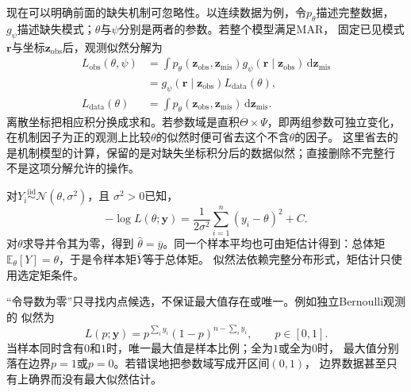 现在可以明确前面的缺失机制可忽略性。以连续数据为例，令\(p_\theta\)描述完整数据，
\(g_\psi\)描述缺失模式；\(\theta\)与\(\psi\)分别是两者的参数。若整个模型满足MAR，
固定已见模式\(\bm r\)与坐标\(\bm z_{\mathrm{obs}}\)后，观测似然分解为
\begin{equation}
\begin{aligned}
 L_{\mathrm{obs}}(\theta,\psi)
 &=\int p_\theta(\bm z_{\mathrm{obs}},\bm z_{\mathrm{mis}})
       g_\psi(\bm r\mid\bm z_{\mathrm{obs}})\,\mathrm d\bm z_{\mathrm{mis}}\\
 &=g_\psi(\bm r\mid\bm z_{\mathrm{obs}})
       L_{\mathrm{data}}(\theta),\\
 L_{\mathrm{data}}(\theta)
 &=\int p_\theta(\bm z_{\mathrm{obs}},\bm z_{\mathrm{mis}})
       \,\mathrm d\bm z_{\mathrm{mis}}.
\end{aligned}
\label{eq:statistics-missing-likelihood}
\end{equation}
离散坐标把相应积分换成求和。若参数域是直积\(\Theta\times\Psi\)，即两组参数可独立变化，
在机制因子为正的观测上比较\(\theta\)的似然时便可省去这个不含\(\theta\)的因子。
这里省去的是机制模型的计算，保留的是对缺失坐标积分后的数据似然；直接删除不完整行
不是这项分解允许的操作。

对\(Y_i\overset{\mathrm{iid}}{\sim}\mathcal{N}(\theta,\sigma^2)\)，且
\(\sigma^2>0\)已知，
\[
  -\log L(\theta;\bm{y})
  =\frac{1}{2\sigma^2}\sum_{i=1}^n(y_i-\theta)^2+C.
\]
对\(\theta\)求导并令其为零，得到
\(\widehat\theta=\overline y\)。同一个样本平均也可由矩估计得到：总体矩
\(\mathbb{E}_\theta[Y]=\theta\)，于是令样本矩\(\overline Y\)等于总体矩。
似然法依赖完整分布形式，矩估计只使用选定矩条件。

“令导数为零”只寻找内点候选，不保证最大值存在或唯一。例如独立Bernoulli观测的
似然为
\[
  L(p;\bm y)=p^{\sum_i y_i}(1-p)^{n-\sum_i y_i},\qquad p\in[0,1].
\]
当样本同时含有\(0\)和\(1\)时，唯一最大值是样本比例；全为\(1\)或全为\(0\)时，
最大值分别落在边界\(p=1\)或\(p=0\)。若错误地把参数域写成开区间\((0,1)\)，
边界数据甚至只有上确界而没有最大似然估计。

